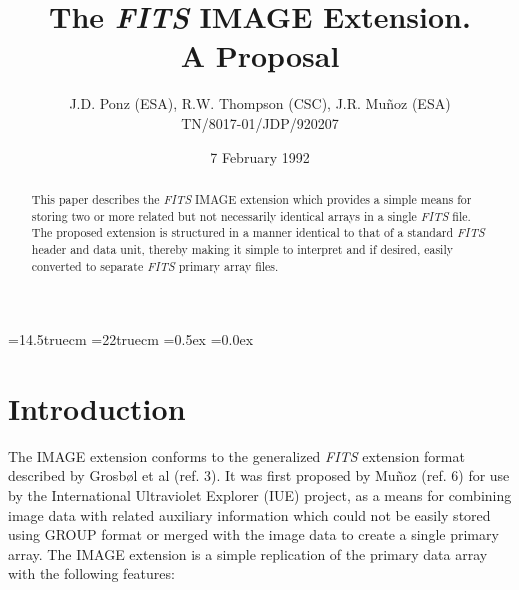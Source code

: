 %
%
%


\textwidth=14.5truecm              %
\textheight=22truecm             %
\topsep=0.5ex                    %
\itemsep=0.0ex                   %

\title{The {\sl FITS} IMAGE Extension. \\
       A Proposal}
\author{J.D. Ponz (ESA), R.W. Thompson (CSC), J.R. Mu\~{n}oz (ESA)\\
TN/8017-01/JDP/920207}
\date{7 February 1992}



\maketitle

\begin{abstract}
This paper describes the {\sl FITS} IMAGE extension which
provides a simple means for storing two or more related but not necessarily
identical arrays in a single {\sl FITS} file. 
The proposed extension is structured in a manner identical to that of a 
standard {\sl FITS} header and data unit, thereby making it simple to 
interpret and if desired, easily converted to separate {\sl FITS} primary 
array files.
\end{abstract}


\section{Introduction}
The IMAGE extension conforms to the generalized {\sl FITS} extension format
described by Grosb\o l et al (ref. 3). It was first proposed by Mu\~{n}oz 
(ref. 6)
for use by the International Ultraviolet Explorer (IUE) project,
as a means for combining image data with related auxiliary information
which could not be easily stored using GROUP format or merged with the
image data to create a single primary array. 
The IMAGE extension is a simple replication of the primary data
array with  the following features:

